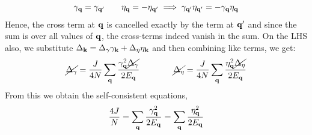 \documentclass{article}
\newcommand{\vk}{\vb{k}}
\newcommand{\ek}{\eta_{\vk}}
\newcommand{\gk}{\gamma_{\vk}}
\begin{document}
$$\gamma_{\vb{q}} = \gamma_{\vb{q}'}\qquad \eta_{\vb{q}} = -\eta_{\vb{q}'}\implies \gamma_{\vb{q}'}\eta_{\vb{q}'} = -\gamma_{\vb{q}}\eta_{\vb{q}}$$
Hence, the cross term at $\vb{q}$ is cancelled exactly by the term at $\vb{q}'$ and since the sum is over all values of $\vb{q}$, the cross-terms indeed vanish in the sum. On the LHS also, we substitute $\Delta_{\vk} = \Delta_{\gamma} \gk + \Delta_{\eta}\ek $ and then combining like terms, we get:
\begin{align}
    \cancel{\Delta_{\gamma}} = \frac{J}{4N} \sum\limits_{\vb{q}}\frac{\gamma_{\vb{q}}^2\cancel{\Delta_{\gamma}} }{2E_{\vb{q}}}\qquad\qquad  \cancel{\Delta_{\eta}} = \frac{J}{4N} \sum\limits_{\vb{q}}\frac{\eta_{\vb{q}}^2\cancel{\Delta_{\eta}} }{2E_{\vb{q}}}
\end{align}
From this we obtain the self-consistent equations, 
\begin{align}
    \frac{4J}{N} =   \sum\limits_{\vb{q}}\frac{\gamma_{\vb{q}}^2}{2E_{\vb{q}}} = \sum\limits_{\vb{q}}\frac{\eta_{\vb{q}}^2}{2E_{\vb{q}}}
\end{align}
\end{document}
